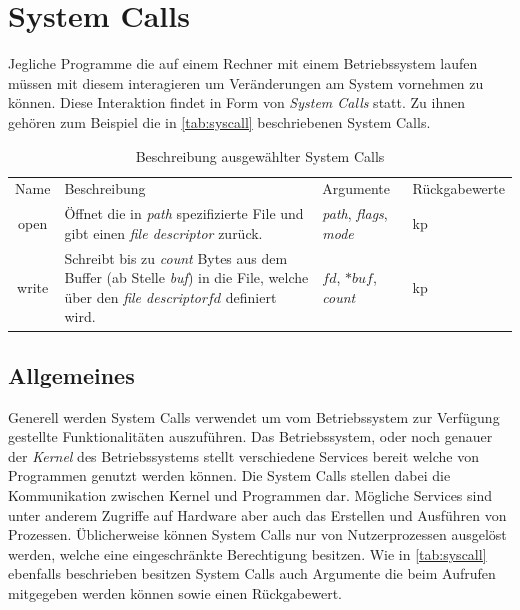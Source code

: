     \section{System Calls}\label{sec:syscalls}
        Jegliche Programme die auf einem Rechner mit einem Betriebssystem laufen müssen mit diesem interagieren um Veränderungen am System vornehmen zu können.
        Diese Interaktion findet in Form von \textit{System Calls}  statt.
        Zu ihnen gehören zum Beispiel die in \autoref{tab:syscall} beschriebenen System Calls.

        \begin{table}[ht]
            \small
            \label{tab:syscall}
            \centering
            \begin{tabular}{cp{6cm}p{3cm}p{3cm}}
                \hline
                \rowcolor{Gray!36}
                \multicolumn{4}{c}{System Calls}\\
                \hline
                Name & Beschreibung & Argumente & Rückgabewerte\\
                \hline
                \hline
                \rowcolor{Gray!16}
                open& Öffnet die in \textit{path} spezifizierte File und gibt einen \textit{file descriptor} zurück.& \textit{path}, \textit{flags}, \textit{mode} & kp\\
                write& Schreibt bis zu \textit{count} Bytes aus dem Buffer (ab Stelle \textit{buf}) in die File, welche über den \textit{file descriptor}$fd$ definiert wird. & $fd$, $*buf$, \textit{count} & kp\\
                \hline
            \end{tabular}
            \caption{Beschreibung ausgewählter System Calls}
        \end{table}

        \subsection{Allgemeines}

        Generell werden System Calls verwendet um vom Betriebssystem zur Verfügung gestellte Funktionalitäten auszuführen.
        Das Betriebssystem, oder noch genauer der \textit{Kernel}  des Betriebssystems stellt verschiedene Services bereit welche von Programmen genutzt werden können. 
        Die System Calls stellen dabei die Kommunikation zwischen Kernel und Programmen dar.
        Mögliche Services sind unter anderem Zugriffe auf Hardware aber auch das Erstellen und Ausführen von Prozessen.
        Üblicherweise können System Calls nur von Nutzerprozessen ausgelöst werden, welche eine eingeschränkte Berechtigung besitzen.
        Wie in \autoref{tab:syscall} ebenfalls beschrieben besitzen System Calls auch Argumente die beim Aufrufen mitgegeben werden können sowie einen Rückgabewert.

